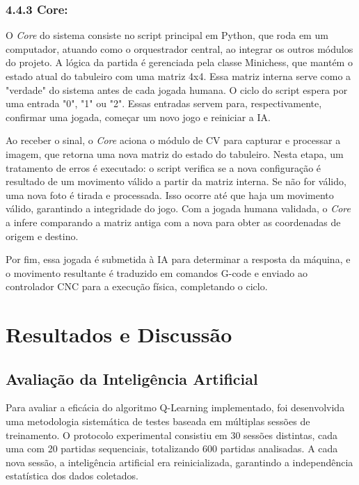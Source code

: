 \documentclass[a4paper]{ifacconf}
\begin{document}
\subsubsection{4.4.3 Core:} 

O \textit{Core} do sistema consiste no script principal em Python, que roda em um computador, atuando como o orquestrador central, ao integrar os outros módulos do projeto. A lógica da partida é gerenciada pela classe Minichess, que mantém o estado atual do tabuleiro com uma matriz 4x4. Essa matriz interna serve como a "verdade" do sistema antes de cada jogada humana. O ciclo do script espera por uma entrada "0", "1" ou "2". Essas entradas servem para, respectivamente, confirmar uma jogada, começar um novo jogo e reiniciar a IA.

Ao receber o sinal, o \textit{Core} aciona o módulo de CV para capturar e processar a imagem, que retorna uma nova matriz do estado do tabuleiro. Nesta etapa, um tratamento de erros é executado: o script verifica se a nova configuração é resultado de um movimento válido a partir da matriz interna. Se não for válido, uma nova foto é tirada e processada. Isso ocorre até que haja um movimento válido, garantindo a integridade do jogo. Com a jogada humana validada, o \textit{Core} a infere comparando a matriz antiga com a nova para obter as coordenadas de origem e destino. 

Por fim, essa jogada é submetida à IA para determinar a resposta da máquina, e o movimento resultante é traduzido em comandos G-code e enviado ao controlador CNC para a execução física, completando o ciclo.

\section{Resultados e Discussão}

\subsection{Avaliação da Inteligência Artificial}

\par\noindent Para avaliar a eficácia do algoritmo Q-Learning implementado, foi desenvolvida uma metodologia sistemática de testes baseada em múltiplas sessões de treinamento. O protocolo experimental consistiu em 30 sessões distintas, cada uma com 20 partidas sequenciais, totalizando 600 partidas analisadas. A cada nova sessão, a inteligência artificial era reinicializada, garantindo a independência estatística dos dados coletados.
\end{document}
